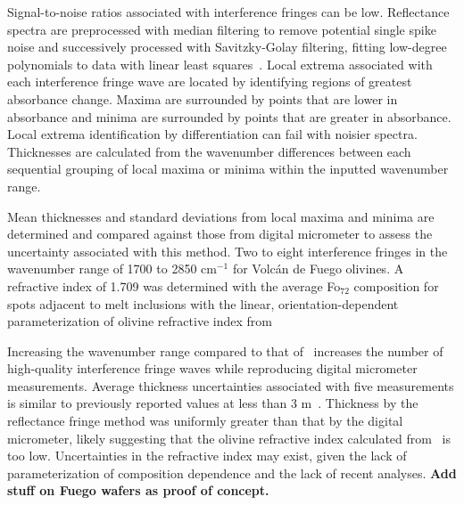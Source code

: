 \documentclass[draft]{agujournal2019}
\begin{document}
Signal-to-noise ratios associated with interference fringes can be low. Reflectance spectra are preprocessed with median filtering to remove potential single spike noise and successively processed with Savitzky-Golay filtering, fitting low-degree polynomials to data with linear least squares~\cite{SavitzkyandGolay1964}. Local extrema associated with each interference fringe wave are located by identifying regions of greatest absorbance change. Maxima are surrounded by points that are lower in absorbance and minima are surrounded by points that are greater in absorbance. Local extrema identification by differentiation can fail with noisier spectra. Thicknesses are calculated from the wavenumber differences between each sequential grouping of local maxima or minima within the inputted wavenumber range. 

Mean thicknesses and standard deviations from local maxima and minima are determined and compared against those from digital micrometer to assess the uncertainty associated with this method. Two to eight interference fringes in the wavenumber range of 1700 to 2850 cm$^{-1}$ for Volcán de Fuego olivines. A refractive index of 1.709 was determined with the average Fo$_{72}$ composition for spots adjacent to melt inclusions with the linear, orientation-dependent parameterization of olivine refractive index from~

Increasing the wavenumber range compared to that of~ increases the number of high-quality interference fringe waves while reproducing digital micrometer measurements. Average thickness uncertainties associated with five measurements is similar to previously reported values at less than 3 \textmu m~\cite{Allisonetal2019, NicholsandWysoczanski2007, vonAulocketal2014}. Thickness by the reflectance fringe method was uniformly greater than that by the digital micrometer, likely suggesting that the olivine refractive index calculated from~ is too low. Uncertainties in the refractive index may exist, given the lack of parameterization of composition dependence and the lack of recent analyses.
\textbf{Add stuff on Fuego wafers as proof of concept.}

\end{document}
